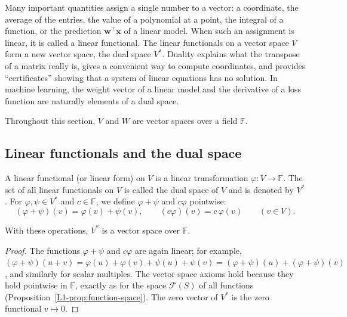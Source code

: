 Many important quantities assign a single number to a vector: a coordinate, the average of the entries, the value of a polynomial at a point, the integral of a function, or the prediction $\mathbf{w}^\top \mathbf{x}$ of a linear model. When such an assignment is linear, it is called a linear functional. The linear functionals on a vector space $V$ form a new vector space, the dual space $V^*$. Duality explains what the transpose of a matrix really is, gives a convenient way to compute coordinates, and provides ``certificates'' showing that a system of linear equations has no solution. In machine learning, the weight vector of a linear model and the derivative of a loss function are naturally elements of a dual space.

Throughout this section, $V$ and $W$ are vector spaces over a field $\mathbb{F}$.

\subsection{Linear functionals and the dual space}

\begin{definition}\label{L1-def:dual}
    A linear functional (or linear form) on $V$ is a linear transformation $\varphi: V \to \mathbb{F}$. The set of all linear functionals on $V$ is called the dual space of $V$ and is denoted by $V^*$. For $\varphi, \psi \in V^*$ and $c \in \mathbb{F}$, we define $\varphi + \psi$ and $c\varphi$ pointwise:
    \[(\varphi + \psi)(v) = \varphi(v) + \psi(v), \qquad (c\varphi)(v) = c\, \varphi(v) \qquad (v \in V).\]
\end{definition}

\begin{proposition}
    With these operations, $V^*$ is a vector space over $\mathbb{F}$.
\end{proposition}

\begin{proof}
    The functions $\varphi + \psi$ and $c\varphi$ are again linear; for example, $(\varphi + \psi)(u + v) = \varphi(u) + \varphi(v) + \psi(u) + \psi(v) = (\varphi + \psi)(u) + (\varphi + \psi)(v)$, and similarly for scalar multiples. The vector space axioms hold because they hold pointwise in $\mathbb{F}$, exactly as for the space $\mathcal{F}(S)$ of all functions (Proposition~\ref{L1-prop:function-space}). The zero vector of $V^*$ is the zero functional $v \mapsto 0$.
\end{proof}

